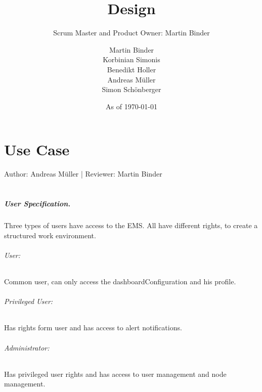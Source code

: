 \documentclass{scrreprt}
\title{Design}
\subtitle{Scrum Master and Product Owner: Martin Binder}
\author{Martin Binder\\Korbinian Simonis\\Benedikt Holler\\Andreas M\"uller\\Simon Sch\"onberger}
\date{As of \today}
\begin{document}
\maketitle
\tableofcontents

\chapter{Use Case}
Author:  Andreas Müller |
Reviewer: Martin Binder\\ \\

\paragraph{User Specification.}
Three types of users have access to the EMS.
All have different rights, to create a structured work environment.
\\ 

\subparagraph{User:}
Common user, can only access the dashboardConfiguration and his profile.

\subparagraph{Privileged User:}
Has rights form user and has access to alert notifications.

\subparagraph{Administrator:}
Has privileged user rights and has access to user management and node management.
\end{document}

